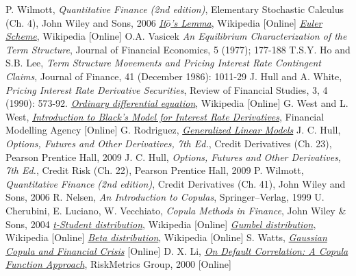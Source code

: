 \begin{thebibliography}{9}
 P. Wilmott, \emph{Quantitative Finance (2nd edition)}, Elementary Stochastic Calculus (Ch. 4), John Wiley and Sons, 2006 
\href{https://en.wikipedia.org/wiki/It\%C3\%B4\%27s_lemma}{\emph{It$\hat{o}$'s Lemma}}, Wikipedia [Online]
 \href{https://en.wikipedia.org/wiki/Euler_method}{\emph{Euler Scheme}}, Wikipedia [Online]
O.A. Vasicek \emph{An Equilibrium Characterization of the Term Structure}, Journal of Financial Economics, 5 (1977); 177-188
T.S.Y. Ho and S.B. Lee, \emph{Term Structure Movements and Pricing Interest Rate Contingent Claims}, Journal of Finance, 41 (December 1986): 1011-29
J. Hull and A. White, \emph{Pricing Interest Rate Derivative Securities}, Review of Financial Studies, 3, 4 (1990): 573-92.
\href{https://en.wikipedia.org/wiki/Ordinary_differential_equation}{\emph{Ordinary differential equation}}, Wikipedia [Online]
 G. West and L. West, \href{http://janroman.dhis.org/finance/Black/IntroToBlack.pdf}{\emph{Introduction to Black's Model for Interest Rate Derivatives}}, Financial Modelling Agency [Online]
 G. Rodriguez, \href{https://data.princeton.edu/wws509/notes/c7s1}{\emph{Generalized Linear Models}} 
 J. C. Hull, \emph{Options, Futures and Other Derivatives, 7th Ed.}, Credit Derivatives (Ch. 23), Pearson Prentice Hall, 2009
 J. C. Hull, \emph{Options, Futures and Other Derivatives, 7th Ed.}, Credit Risk (Ch. 22), Pearson Prentice Hall, 2009
P. Wilmott, \emph{Quantitative Finance (2nd edition)}, Credit Derivatives (Ch. 41), John Wiley and Sons, 2006 
R. Nelsen, \emph{An Introduction to Copulas}, Springer–Verlag, 1999
U. Cherubini, E. Luciano, W. Vecchiato, \emph{Copula Methods in Finance}, John Wiley \& Sons, 2004
\href{https://en.wikipedia.org/wiki/Student\%27s\_t-distribution}{\emph{t-Student distribution}}, Wikipedia [Online]
\href{https://en.wikipedia.org/wiki/Gumbel_distribution}{\emph{Gumbel distribution}}, Wikipedia [Online]
\href{https://en.wikipedia.org/wiki/Beta_distribution}{\emph{Beta distribution}}, Wikipedia [Online]
 S. Watts, \href{http://samueldwatts.com/wp-content/uploads/2016/08/Watts-Gaussian-Copula_Financial_Crisis.pdf}{\emph{Gaussian Copula and Financial Crisis}} [Online]
D. X. Li, \href{http://www.maths.lth.se/matstat/kurser/fmsn15masm23/default.pdf}{\emph{On Default Correlation: A Copula Function Approach}}, RiskMetrics Group, 2000 [Online]

\end{thebibliography}
